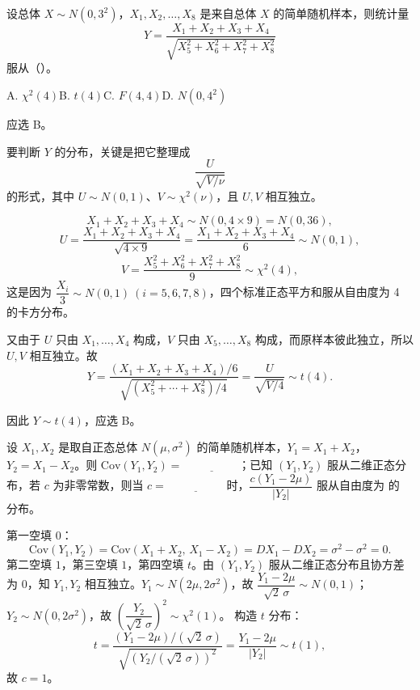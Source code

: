﻿\documentclass[lang=cn,11pt]{elegantbook}
\begin{document}
\begin{exercise}\label{exer:6-y-t-dist}
设总体 \(X \sim N(0, 3^2)\)，\(X_1, X_2, \dots, X_8\) 是来自总体 \(X\) 的简单随机样本，则统计量
\[
Y = \frac{X_1 + X_2 + X_3 + X_4}{\sqrt{X_5^2 + X_6^2 + X_7^2 + X_8^2}}
\]
服从（\quad）。\par
A. \(\chi^2(4)\)\quad B. \(t(4)\)\quad C. \(F(4,4)\)\quad D. \(N(0, 4^2)\)
\end{exercise}

\begin{solution}
应选 B。

要判断 \(Y\) 的分布，关键是把它整理成
\[
\frac{U}{\sqrt{V/\nu}}
\]
的形式，其中 \(U\sim N(0,1)\)、\(V\sim\chi^2(\nu)\)，且 \(U,V\) 相互独立。

\[
X_1+X_2+X_3+X_4\sim N(0,4\times 9)=N(0,36),
\]
\[
U = \frac{X_1+X_2+X_3+X_4}{\sqrt{4 \times 9}} = \frac{X_1+X_2+X_3+X_4}{6} \sim N(0,1),
\]
\[
V = \frac{X_5^2+X_6^2+X_7^2+X_8^2}{9} \sim \chi^2(4),
\]
这是因为 \(\dfrac{X_i}{3}\sim N(0,1)\ (i=5,6,7,8)\)，四个标准正态平方和服从自由度为 4 的卡方分布。

又由于 \(U\) 只由 \(X_1,\dots,X_4\) 构成，\(V\) 只由 \(X_5,\dots,X_8\) 构成，而原样本彼此独立，所以 \(U,V\) 相互独立。故
\[
Y = \frac{(X_1+X_2+X_3+X_4)/6}{\sqrt{(X_5^2+\cdots+X_8^2)/4}} = \frac{U}{\sqrt{V/4}} \sim t(4).
\]

因此 \(Y\sim t(4)\)，应选 B。
\end{solution}


\begin{exercise}\label{exer:6-cov-t}
设 \(X_1, X_2\) 是取自正态总体 \(N(\mu, \sigma^2)\) 的简单随机样本，\(Y_1=X_1+X_2\)，\(Y_2=X_1-X_2\)。则 \(\mathrm{Cov}(Y_1, Y_2) =\,\underline{\hspace{2cm}}\)；已知 \((Y_1, Y_2)\) 服从二维正态分布，若 \(c\) 为非零常数，则当 \(c =\,\underline{\hspace{2cm}}\) 时，\(\dfrac{c(Y_1-2\mu)}{|Y_2|}\) 服从自由度为\,\underline{\hspace{2cm}}\,的\,\underline{\hspace{2cm}}\,分布。
\end{exercise}
\begin{solution}
第一空填 \(0\)：
\[
\mathrm{Cov}(Y_1, Y_2) = \mathrm{Cov}(X_1+X_2,\, X_1-X_2) = DX_1 - DX_2 = \sigma^2 - \sigma^2 = 0.
\]
第二空填 \(1\)，第三空填 \(1\)，第四空填 \(t\)。由 \((Y_1,Y_2)\) 服从二维正态分布且协方差为 0，知 \(Y_1, Y_2\) 相互独立。\(Y_1 \sim N(2\mu, 2\sigma^2)\)，故 \(\dfrac{Y_1-2\mu}{\sqrt{2}\,\sigma} \sim N(0,1)\)；\(Y_2 \sim N(0, 2\sigma^2)\)，故 \(\left(\dfrac{Y_2}{\sqrt{2}\,\sigma}\right)^{\!2} \sim \chi^2(1)\)。
构造 \(t\) 分布：
\[
t = \frac{(Y_1-2\mu)/(\sqrt{2}\,\sigma)}{\sqrt{(Y_2/(\sqrt{2}\,\sigma))^2}} = \frac{Y_1-2\mu}{|Y_2|} \sim t(1),
\]
故 \(c = 1\)。
\end{solution}
\end{document}
